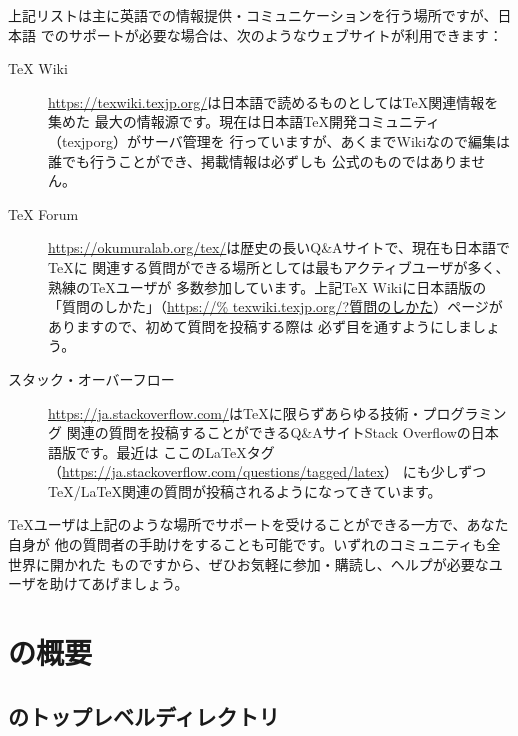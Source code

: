 \documentclass[uplatex,dvipdfmx,12pt,tombow]{jsarticle}
\begin{document}
%
\begin{janote}
上記リストは主に英語での情報提供・コミュニケーションを行う場所ですが、日本語
でのサポートが必要な場合は、次のようなウェブサイトが利用できます：
%
\begin{description}
\item[{\TeX} Wiki]
\url{https://texwiki.texjp.org/}は日本語で読めるものとしては\TeX 関連情報を集めた
最大の情報源です。現在は日本語\TeX 開発コミュニティ（texjporg）がサーバ管理を
行っていますが、あくまでWikiなので編集は誰でも行うことができ、掲載情報は必ずしも
公式のものではありません。

\item[{\TeX} Forum]
\url{https://okumuralab.org/tex/}は歴史の長いQ\&Aサイトで、現在も日本語で\TeX に
関連する質問ができる場所としては最もアクティブユーザが多く、熟練の\TeX ユーザが
多数参加しています。上記{\TeX} Wikiに日本語版の「質問のしかた」（\url{https://%
texwiki.texjp.org/?質問のしかた}）ページがありますので、初めて質問を投稿する際は
必ず目を通すようにしましょう。

\item[スタック・オーバーフロー]
\url{https://ja.stackoverflow.com/}は\TeX に限らずあらゆる技術・プログラミング
関連の質問を投稿することができるQ\&AサイトStack Overflowの日本語版です。最近は
ここの\LaTeX タグ（\url{https://ja.stackoverflow.com/questions/tagged/latex}）
にも少しずつ\TeX/\LaTeX 関連の質問が投稿されるようになってきています。
\end{description}
\end{janote}

\TeX ユーザは上記のような場所でサポートを受けることができる一方で、あなた自身が
他の質問者の手助けをすることも可能です。いずれのコミュニティも全世界に開かれた
ものですから、ぜひお気軽に参加・購読し、ヘルプが必要なユーザを助けてあげましょう。

\section{\TL の概要}
\label{sec:overview-tl}

\subsection{\TL のトップレベルディレクトリ}
\label{sec:tld}
\end{document}
